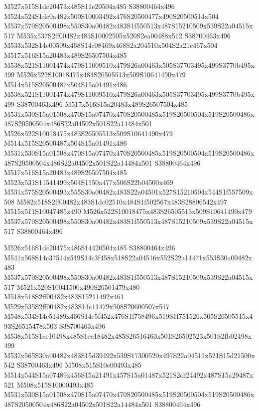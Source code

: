 \documentclass{article}
\begin{document}
\begin{multicols}{2}
M527x515S1dc20473x485S11e20504x485 S38800464x496 M524x524S1dc0a482x500S10003492x476S20500477x490S20500514x504 M537x570S20500498x550S30a00482x483S1f550513x487S15210509x539S22a04515x517 M535x537S2ff00482x483S10002505x520S2ea00488x512 S38700463x496 M533x532S14c00509x468S14c08469x468S2a204510x504S2a21c467x504 M517x516S15a20483x489S26507504x485 M538x521S11001474x479S11009510x479S26a00463x505S37703495x499S3770b495x499 M526x522S10018475x483S26505513x509S10641490x479 M514x515S20500487x504S15a01491x486 M538x521S11001474x479S11009510x479S26a00463x505S37703495x499S3770b495x499 S38700463x496 M517x516S15a20483x489S26507504x485 M531x530S15a01508x470S15a07470x470S20500485x519S20500504x519S20500486x487S20500504x486S22a04502x501S22a14484x501 M526x522S10018475x483S26505513x509S10641490x479 M514x515S20500487x504S15a01491x486 M531x530S15a01508x470S15a07470x470S20500485x519S20500504x519S20500486x487S20500504x486S22a04502x501S22a14484x501 S38800464x496 M517x516S15a20483x489S26507504x485 M523x531S11541499x504S1150a477x506S22b04500x469 M531x575S20500493x555S30a00482x483S22a04501x527S15210504x544S1f557509x508 M582x518S2ff00482x483S1dc02510x484S1f502567x483S28806542x497 M515x511S10047485x490 M526x522S10018475x483S26505513x509S10641490x479 M537x570S20500498x550S30a00482x483S1f550513x487S15210509x539S22a04515x517 S38800464x496

M526x516S1dc20475x486S14420504x485 S38800464x496 M541x568S14c37514x519S14c3f458x518S22a04516x552S22a14471x553S30a00482x483 M537x570S20500498x550S30a00482x483S1f550513x487S15210509x539S22a04515x517 M521x520S10041500x490S26501479x480 M518x518S2ff00482x483S15211492x461 M529x535S2ff00482x483S14c11479x508S20600507x517 M548x534S14c51489x466S14c5f452x476S1f758496x519S1f751526x505S26505515x493S26515478x503 S38700463x496 M538x515S1ce10498x485S1ce18482x485S26516463x501S26502523x501S2fb02498x499 M537x565S30a00482x483S15d39492x539S17300520x497S22a04511x521S15d21500x542 S38700463x496 M508x515S10e00493x485 M514x544S15a07489x456S15a21491x457S15a01487x521S2df24492x487S15a29487x521 M508x515S10000493x485 M531x530S15a01508x470S15a07470x470S20500485x519S20500504x519S20500486x487S20500504x486S22a04502x501S22a14484x501 S38800464x496


\end{multicols}
\end{document}
